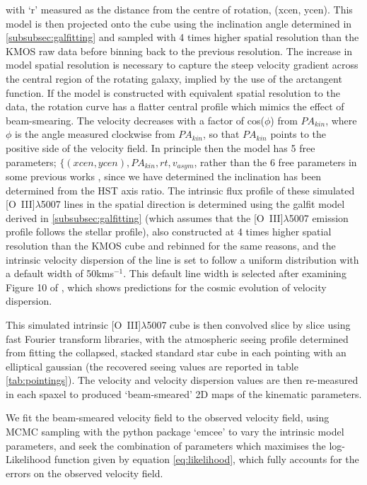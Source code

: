 \documentclass[fleqn,usenatbib]{mn2e}
\begin{document}
\noindent
with `r' measured as the distance from the centre of rotation, (xcen, ycen).
This model is then projected onto the cube using the inclination angle determined in \cref{subsubsec:galfitting} and sampled with 4 times higher spatial resolution than the KMOS raw data before binning back to the previous resolution.
The increase in model spatial resolution is necessary to capture the steep velocity gradient across the central region of the rotating galaxy, implied by the use of the arctangent function.
If the model is constructed with equivalent spatial resolution to the data, the rotation curve has a flatter central profile which mimics the effect of beam-smearing.
The velocity decreases with a factor of cos($\phi$) from $PA_{kin}$, where $\phi$ is the angle measured clockwise from $PA_{kin}$, so that $PA_{kin}$ points to the positive side of the velocity field.
In principle then the model has 5 free parameters; $\{(xcen, ycen), PA_{kin}, rt, v_{asym}$, rather than the 6 free parameters in some previous works \citep[e.g.][]{Stott2016}, since we have determined the inclination has been determined from the HST axis ratio.
The intrinsic flux profile of these simulated [O~{\sc III}]$\lambda$5007 lines in the spatial direction is determined using the galfit model derived in \cref{subsubsec:galfitting} (which assumes that the [O~{\sc III}]$\lambda$5007 emission profile follows the stellar profile), also constructed at 4 times higher spatial resolution than the KMOS cube and rebinned for the same reasons, and the intrinsic velocity dispersion of the line is set to follow a uniform distribution with a default width of 50kms$^{-1}$.
This default line width is selected after examining Figure 10 of \cite{Wisnioski2015}, which shows predictions for the cosmic evolution of velocity dispersion.

This simulated intrinsic [O~{\sc III}]$\lambda$5007 cube is then convolved slice by slice using fast Fourier transform libraries, with the atmospheric seeing profile determined from fitting the collapsed, stacked standard star cube in each pointing with an elliptical gaussian (the recovered seeing values are reported in table \ref{tab:pointings}).
The velocity and velocity dispersion values are then re-measured in each spaxel to produced `beam-smeared' 2D maps of the kinematic parameters.

We fit the beam-smeared velocity field to the observed velocity field, using MCMC sampling with the python package `emcee' \citep{Foreman-Mackey2013} to vary the intrinsic model parameters, and seek the combination of parameters which maximises the log-Likelihood function given by equation \ref{eq:likelihood}, which fully accounts for the errors on the observed velocity field.
\end{document}
